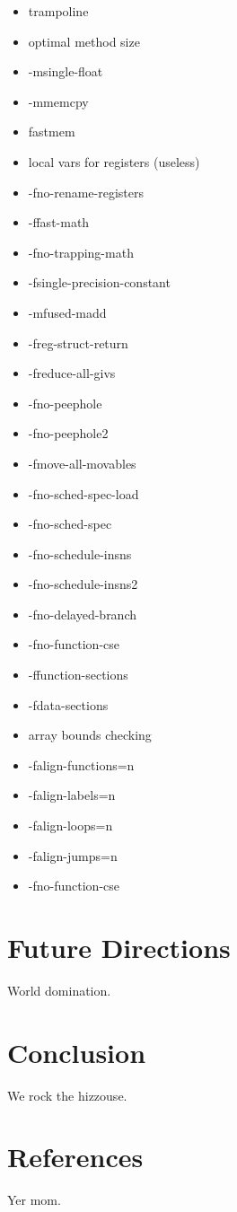 \documentclass{acmconf}
\begin{document}
\begin{itemize}
\item trampoline
\item optimal method size
\item -msingle-float
\item -mmemcpy
\item fastmem
\item local vars for registers (useless)
\item -fno-rename-registers
\item -ffast-math
\item -fno-trapping-math
\item -fsingle-precision-constant
\item -mfused-madd
\item -freg-struct-return
\item -freduce-all-givs
\item -fno-peephole
\item -fno-peephole2
\item -fmove-all-movables
\item -fno-sched-spec-load
\item -fno-sched-spec
\item -fno-schedule-insns
\item -fno-schedule-insns2
\item -fno-delayed-branch
\item -fno-function-cse
\item -ffunction-sections
\item -fdata-sections
\item array bounds checking
\item -falign-functions=n
\item -falign-labels=n
\item -falign-loops=n
\item -falign-jumps=n
\item -fno-function-cse
\end{itemize}

\section{Future Directions}

World domination.

\section{Conclusion}

We rock the hizzouse.

\section{References}

Yer mom.
\end{document}
